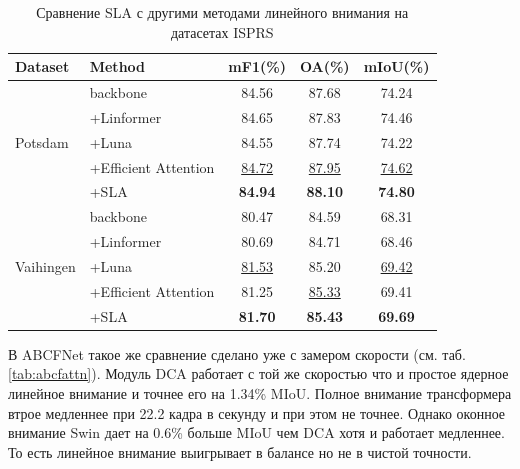 \documentclass[areasetadvanced]{scrartcl}
\begin{document}
		\begin{table}[H]
			\centering
			\footnotesize
			\caption{Сравнение SLA с другими методами линейного внимания на датасетах ISPRS \cite{glanet}}
			\label{tab:glanet3}
			\begin{tabular}{llccc}
				\toprule
				Dataset & Method & mF1(\%) & OA(\%) & mIoU(\%) \\
				\midrule
				\multirow{5}{*}{Potsdam} & backbone & 84.56 & 87.68 & 74.24 \\
				 & +Linformer & 84.65 & 87.83 & 74.46 \\
				 & +Luna & 84.55 & 87.74 & 74.22 \\
				 & +Efficient Attention & \underline{84.72} & \underline{87.95} & \underline{74.62} \\
				 & +SLA & \textbf{84.94} & \textbf{88.10} & \textbf{74.80} \\
				\midrule
				\multirow{5}{*}{Vaihingen} & backbone & 80.47 & 84.59 & 68.31 \\
				 & +Linformer & 80.69 & 84.71 & 68.46 \\
				 & +Luna & \underline{81.53} & 85.20 & \underline{69.42} \\
				 & +Efficient Attention & 81.25 & \underline{85.33} & 69.41 \\
				 & +SLA & \textbf{81.70} & \textbf{85.43} & \textbf{69.69} \\
				\bottomrule
			\end{tabular}
		\end{table}

		В ABCFNet \cite{abcfnet} такое же сравнение сделано уже с замером скорости  (см. таб. \ref{tab:abcfattn}). Модуль DCA
		работает с той же скоростью что и простое ядерное линейное внимание и точнее его на 1.34\% MIoU. Полное внимание трансформера втрое медленнее при
		22.2 кадра в секунду и при этом не точнее. Однако оконное внимание Swin дает на 0.6\% больше MIoU чем DCA хотя и работает медленнее. То есть
		линейное внимание выигрывает в балансе но не в чистой точности.
\end{document}
